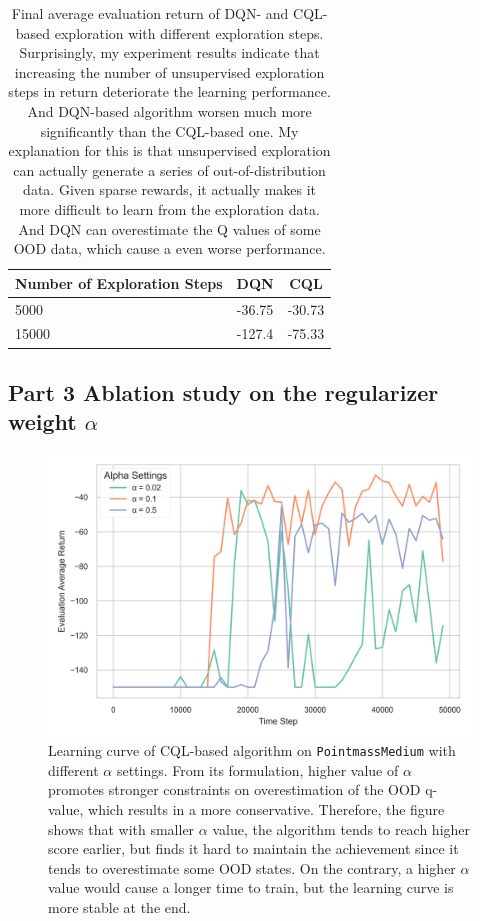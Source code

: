 \documentclass[10pt, letterpaper]{article}
\begin{document}
\begin{table}[h!]
    \centering
    \caption{Final average evaluation return of DQN- and CQL-based exploration with different exploration steps. Surprisingly, my experiment results indicate that increasing the number of unsupervised exploration steps in return deteriorate the learning performance. And DQN-based algorithm worsen much more significantly than the CQL-based one. My explanation for this is that unsupervised exploration can actually generate a series of out-of-distribution data. Given sparse rewards, it actually makes it more difficult to learn from the exploration data. And DQN can overestimate the Q values of some OOD data, which cause a even worse performance.}
    \begin{tabular}{lcc}
        \hline
        \multicolumn{1}{c}{\textbf{Number of Exploration Steps}} & \textbf{DQN} & \textbf{CQL} \\ \hline
        5000                                                     & -36.75       & -30.73       \\
        15000                                                    & -127.4       & -75.33       \\ \hline
    \end{tabular}
\end{table}

\subsection*{Part 3 Ablation study on the regularizer weight $\alpha$}

\begin{figure}[h!]
    \centering
    \includegraphics[width=\textwidth]{q2_3.png}
    \caption{Learning curve of CQL-based algorithm on \texttt{PointmassMedium} with different $\alpha$ settings. From its formulation, higher value of $\alpha$ promotes stronger constraints on overestimation of the OOD q-value, which results in a more conservative. Therefore, the figure shows that with smaller $\alpha$ value, the algorithm tends to reach higher score earlier, but finds it hard to maintain the achievement since it tends to overestimate some OOD states. On the contrary, a higher $\alpha$ value would cause a longer time to train, but the learning curve is more stable at the end.}
\end{figure}
\end{document}
